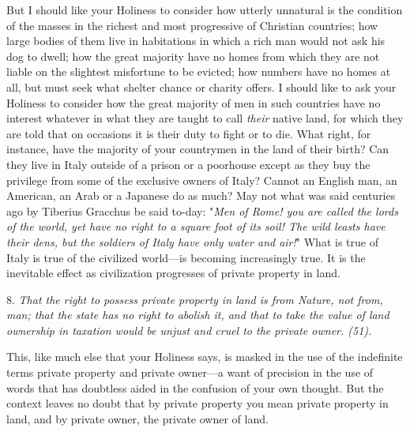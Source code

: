 \documentclass{book}
\begin{document}
But I should like your Holiness to consider how utterly unnatural is the condition of the masses in the richest and most progressive of Christian countries; how large bodies of them live in habitations in which a rich man would not ask his dog to dwell; how the great majority have no homes from which they are not liable on the slightest misfortune to be evicted; how numbers have no homes at all, but must seek what shelter chance or charity offers. I should like to ask your Holiness to consider how the great majority of men in such countries have no interest whatever in what they are taught to call \emph{their} native land, for which they are told that on occasions it is their duty to fight or to die. What right, for instance, have the majority of your countrymen in the land of their birth? Can they live in Italy outside of a prison or a poorhouse except as they buy the privilege from some of the exclusive owners of Italy? Cannot an English man, an American, an Arab or a Japanese do as much? May not what was said centuries ago by Tiberius Gracchus be said to-day: "\emph{Men of Rome! you are called the lords of the world, yet have no right to a square foot of its soil! The wild leasts have their dens, but the soldiers of Italy have only water and air!}" What is true of Italy is true of the civilized world—is becoming increasingly true. It is the inevitable effect as civilization progresses of private property in land.

8. \emph{That the right to possess private property in land is from Nature, not from, man; that the state has no right to abolish it, and that to take the value of land ownership in taxation would be unjust and cruel to the private owner. (51).}

This, like much else that your Holiness says, is masked in the use of the indefinite terms private property and private owner—a want of precision in the use of words that has doubtless aided in the confusion of your own thought. But the context leaves no doubt that by private property you mean private property in land, and by private owner, the private owner of land.
\end{document}
